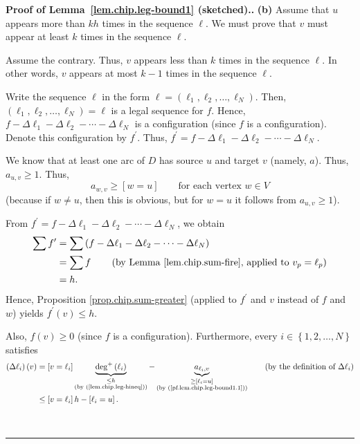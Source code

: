 \documentclass[numbers=enddot,12pt,final,onecolumn,notitlepage]{scrartcl}%
\theoremstyle{definition}
\newenvironment{proof}[1][Proof]{\noindent\textbf{#1.} }{\ \rule{0.5em}{0.5em}}
\let\sumnonlimits\sum
\renewcommand{\sum}{\sumnonlimits\limits}
\begin{document}
\begin{proof}[Proof of Lemma~\ref{lem.chip.leg-bound1} (sketched).]
\textbf{(b)} Assume that $u$ appears more than $kh$ times in the sequence
$\ell$. We must prove that $v$ must appear at least $k$ times in the sequence
$\ell$.

Assume the contrary. Thus, $v$ appears less than $k$ times in the sequence
$\ell$. In other words, $v$ appears at most $k-1$ times in the sequence $\ell$.

Write the sequence $\ell$ in the form $\ell=\left(  \ell_{1},\ell_{2}%
,\ldots,\ell_{N}\right)  $. Then, $\left(  \ell_{1},\ell_{2},\ldots,\ell
_{N}\right)  =\ell$ is a legal sequence for $f$. Hence, $f-\Delta\ell
_{1}-\Delta\ell_{2}-\cdots-\Delta\ell_{N}$ is a configuration (since $f$ is a
configuration). Denote this configuration by $f^{\prime}$. Thus, $f^{\prime
}=f-\Delta\ell_{1}-\Delta\ell_{2}-\cdots-\Delta\ell_{N}$.

We know that at least one arc of $D$ has source $u$ and target $v$ (namely,
$a$). Thus, $a_{u,v}\geq1$. Thus,%
\begin{equation}
a_{w,v}\geq\left[  w=u\right]  \qquad\text{for each vertex }w\in V
\label{pf.lem.chip.leg-bound1.1}%
\end{equation}
(because if $w\neq u$, then this is obvious, but for $w=u$ it follows from
$a_{u,v}\geq1$).

From $f^{\prime}=f-\Delta\ell_{1}-\Delta\ell_{2}-\cdots-\Delta\ell_{N}$, we
obtain%
\begin{align*}
\sum f^{\prime}  &  =\sum\left(  f-\Delta\ell_{1}-\Delta\ell_{2}-\cdots
-\Delta\ell_{N}\right) \\
&  =\sum f\qquad\left(
\text{by Lemma~\ref{lem.chip.sum-fire}, applied to } v_p = \ell_p
\right) \\
&  =h.
\end{align*}
Hence, Proposition \ref{prop.chip.sum-greater} (applied to $f^{\prime}$ and
$v$ instead of $f$ and $w$) yields $f^{\prime}\left(  v\right)  \leq h$.

Also, $f\left(  v\right)  \geq0$ (since $f$ is a configuration). Furthermore,
every $i\in\left\{  1,2,\ldots,N\right\}  $ satisfies%
\begin{align}
\left(  \Delta\ell_{i}\right)  \left(  v\right)    & =\left[  v=\ell
_{i}\right]  \underbrace{\deg^{+}\left(  \ell_{i}\right)  }_{\substack{\leq
h\\\text{(by (\ref{lem.chip.leg-hineq}))}}}-\underbrace{a_{\ell_{i},v}%
}_{\substack{\geq\left[  \ell_{i}=u\right]  \\\text{(by
(\ref{pf.lem.chip.leg-bound1.1}))}}}\qquad \left(  \text{by the
definition of }\Delta\ell_{i}\right)  \nonumber\\
& \leq\left[  v=\ell_{i}\right]  h-\left[  \ell_{i}=u\right]
.\label{pf.lem.chip.leg-bound1.3}%
\end{align}



\end{proof}
\end{document}
